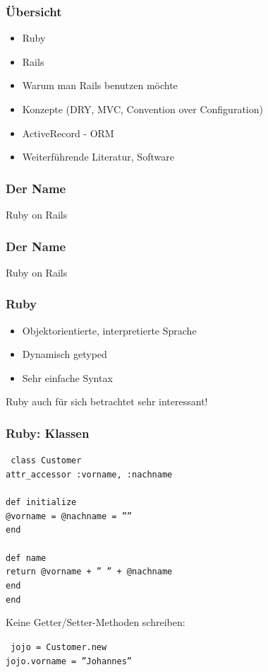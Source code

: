 \begin{frame}
  \frametitle{Übersicht}
  \begin{itemize}
    \item Ruby
    \item Rails
    \item Warum man Rails benutzen möchte
    \item Konzepte (DRY, MVC, Convention over Configuration)
    \item ActiveRecord - ORM
    \item Weiterführende Literatur, Software
  \end{itemize}
\end{frame}


\begin{frame}
  \frametitle{Der Name}
  \begin{center}
    \Huge Ruby on Rails
  \end{center}
\end{frame}

\begin{frame}
  \frametitle{Der Name}
  \begin{center}
    \Huge {\color{red}Ruby} on Rails
  \end{center}
\end{frame}

\begin{frame}
  \frametitle{Ruby}
  \begin{itemize}
    \item Objektorientierte, interpretierte Sprache
    \item Dynamisch getyped
    \item Sehr einfache Syntax
  \end{itemize}
  \begin{center}
    Ruby auch für sich betrachtet sehr interessant!
  \end{center}
\end{frame}

\begin{frame}
  \frametitle{Ruby: Klassen}
  { \tt \small
  class Customer \\
  \enskip attr\_accessor :vorname, :nachname \\
  \enskip \\
  \enskip def initialize \\
  \enskip \enskip @vorname = @nachname = '''' \\
  \enskip end \\
  \enskip \\
  \enskip def name \\
  \enskip \enskip return @vorname + '' '' + @nachname \\
  \enskip end \\
  end \\
  }
  \pause
  \begin{center}
    \small Keine Getter/Setter-Methoden schreiben:
  \end{center}
  { \tt \small
  jojo = Customer.new \\
  jojo.vorname = ''Johannes'' \\
  }
\end{frame}

